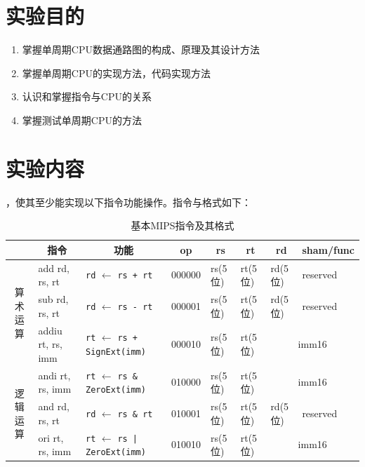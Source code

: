 \documentclass[12pt,UTF8]{ctexart}
\newcommand{\wuhao}{\fontsize{10.5pt}{\baselineskip}\selectfont}
\newcommand{\liuhao}{\fontsize{7.5pt}{\baselineskip}\selectfont}
\begin{document}
\begin{spacing}{1.1}
\wuhao
\section{实验目的}
\begin{enumerate}
	\item 掌握单周期CPU数据通路图的构成、原理及其设计方法
	\item 掌握单周期CPU的实现方法，代码实现方法
	\item 认识和掌握指令与CPU的关系
	\item 掌握测试单周期CPU的方法
\end{enumerate}


\section{实验内容}
，使其至少能实现以下指令功能操作。指令与格式如下：
\begin{table}[htbp]
  \centering\liuhao
  \caption{基本MIPS指令及其格式}
    \begin{tabular}{|c|l|l|l|l|l|l|l|}
    \hline
          & \multicolumn{1}{c|}{指令} & \multicolumn{1}{c|}{功能} & \multicolumn{1}{c|}{op} & \multicolumn{1}{c|}{rs} & \multicolumn{1}{c|}{rt} & \multicolumn{1}{c|}{rd} & \multicolumn{1}{c|}{sham/func} \\
    \hline
    \multirow{3}[6]{*}{算术运算} & add rd, rs, rt & \verb'rd' $\gets$ \verb'rs + rt' & 000000 & rs(5位) & rt(5位) & rd(5位) & reserved \\
\cline{2-8}          & sub rd, rs, rt & \verb'rd' $\gets$ \verb'rs - rt' & 000001 & rs(5位) & rt(5位) & rd(5位) & reserved \\
\cline{2-8}          & addiu rt, rs, imm & \verb'rt' $\gets$ \verb'rs + SignExt(imm)' & 000010 & rs(5位) & rt(5位) & \multicolumn{2}{c|}{imm16} \\
    \hline
    \multirow{4}[8]{*}{逻辑运算} & andi rt, rs, imm & \verb'rt' $\gets$ \verb'rs & ZeroExt(imm)' & 010000 & rs(5位) & rt(5位) & \multicolumn{2}{c|}{imm16} \\
\cline{2-8}          & and rd, rs, rt & \verb'rd' $\gets$ \verb'rs & rt' & 010001 & rs(5位) & rt(5位) & rd(5位) & reserved \\
\cline{2-8}          & ori rt, rs, imm & \verb'rt' $\gets$ \verb'rs | ZeroExt(imm)' & 010010 & rs(5位) & rt(5位) & \multicolumn{2}{c|}{imm16} \\

\end{tabular}
\end{table}
\end{spacing}
\end{document}
